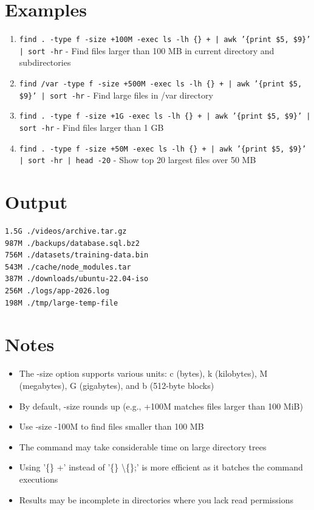 \documentclass[openany]{book}
\begin{document}
\section*{Examples}
\begin{enumerate}
  \item \texttt{find . -type f -size +100M -exec ls -lh \{\} + | awk '\{print \$5, \$9\}' | sort -hr} - Find files larger than 100 MB in current directory and subdirectories
  \item \texttt{find /var -type f -size +500M -exec ls -lh \{\} + | awk '\{print \$5, \$9\}' | sort -hr} - Find large files in /var directory
  \item \texttt{find . -type f -size +1G -exec ls -lh \{\} + | awk '\{print \$5, \$9\}' | sort -hr} - Find files larger than 1 GB
  \item \texttt{find . -type f -size +50M -exec ls -lh \{\} + | awk '\{print \$5, \$9\}' | sort -hr | head -20} - Show top 20 largest files over 50 MB
\end{enumerate}

\section*{Output}
\begin{lstlisting}
1.5G ./videos/archive.tar.gz
987M ./backups/database.sql.bz2
756M ./datasets/training-data.bin
543M ./cache/node_modules.tar
387M ./downloads/ubuntu-22.04-iso
256M ./logs/app-2026.log
198M ./tmp/large-temp-file
\end{lstlisting}

\section*{Notes}
\begin{itemize}
  \item The -size option supports various units: c (bytes), k (kilobytes), M (megabytes), G (gigabytes), and b (512-byte blocks)
  \item By default, -size rounds up (e.g., +100M matches files larger than 100 MiB)
  \item Use -size -100M to find files smaller than 100 MB
  \item The command may take considerable time on large directory trees
  \item Using '\{\}  +' instead of '\{\}  \textbackslash\{\};' is more efficient as it batches the command executions
  \item Results may be incomplete in directories where you lack read permissions
\end{itemize}
\end{document}
